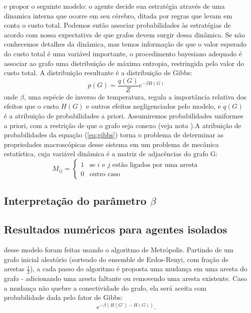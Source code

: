  e propor o seguinte modelo: o agente decide sua estratégia através de uma dinamica interna que ocorre em seu cérebro, ditada por regras que levam em conta o custo total. Podemos então associar probabilidades às estratégias de acordo com nossa expectativa de que grafos devem surgir dessa dinâmica. Se não conhecemos detalhes da dinâmica, mas temos informação de que o valor esperado do custo total é uma variável importante, o procedimento bayesiano adequado é associar ao grafo uma distribuição de máxima entropia, restringida pelo valor do custo total. A distribuição resultante é a distribuição de Gibbs:
\begin{equation}
   \label{eq:gibbs}
   p(G) = \frac{q(G)}{Z} e^{-\beta H(G)}
\end{equation}
onde $\beta$, uma espécie de inverso de temperatura, regula a importância relativa dos efeitos que o custo \(H(G)\) e outros efeitos negligenciados pelo modelo, e \(q(G)\) é a atribuição de probabilidades a priori. Assumiremos probabilidades uniformes a priori, com a restrição de que o grafo seja conexo (veja nota \footnotemark[\value{footnote}]).A atribuição de probabilidades da equação (\ref{eq:gibbs}) torna o problema de determinar as propriedades macroscópicas desse sistema em um problema de mecânica estatística, cuja variável dinâmica é a matriz de adjacências do grafo G:
\begin{equation}
  M_{ij} = \begin{cases}
      1  & \text{se $i$ e $j$ estão ligados por uma aresta} \\
      0  & \text{outro caso}
           \end{cases}
\end{equation}
\subsection{Interpretação do parâmetro $\beta$}
\subsection{Resultados numéricos para agentes isolados}
 desse modelo foram feitas usando o algoritmo de Metrópolis. Partindo de um grafo inicial aleatório (sorteado do ensemble de Erdos-Renyi, com fração de arestas $\frac{1}{2}$), a cada passo do algoritmo é proposta uma mudança em uma aresta do grafo - adicionando uma aresta faltante ou removendo uma aresta existente. Caso a mudança não quebre a conectividade do grafo, ela será aceita com probabilidade dada pelo fator de Gibbs: 
\begin{equation}
\label{eq:gibbsfactor}
e^{-\beta \left(H(G') - H(G)\right)}.
\end{equation}


